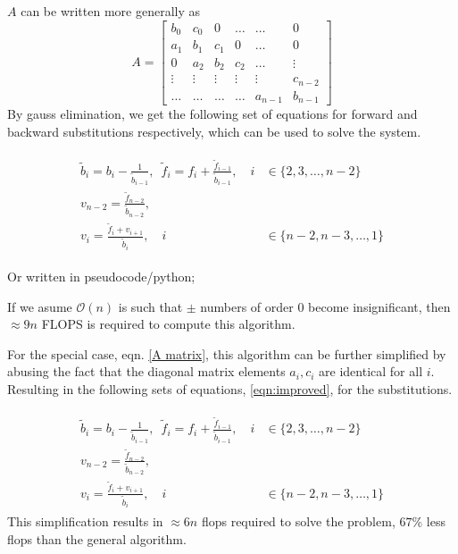 \documentclass[10pt,showpacs,preprintnumbers,footinbib,amsmath,amssymb,aps,prl,twocolumn,groupedaddress,superscriptaddress,showkeys]{revtex4-1}
\begin{document}
  $A$ can be written more generally as
  \begin{equation}
    \label{A matrix general}
    A = \left[ 
    \begin{matrix}
      b_0 & c_0 & 0 & \dots  & \dots &0 \\
      a_1 & b_1 & c_1 & 0 & \dots &  0 \\
      0 & a_2 & b_2 & c_2 & \dots & \vdots  \\
      \vdots & \vdots & \vdots & \vdots & \vdots & c_{n-2}\\
      \dots & \dots & \dots & \dots & a_{n-1} & b_{n-1}
    \end{matrix}
    \right]
  \end{equation}
  By gauss elimination, we get the following set of equations for forward and backward substitutions respectively, which can be used to solve the system.

    \begin{align}
    \begin{split}
      \label{eqn:improved}
      \tilde b_i = b_i - \frac{1}{\tilde b_{i-1}}, 
      \enspace
      \tilde f_i = f_i + \frac{\tilde f_{i -1}}{\tilde b_{i-1}}, 
      \quad i &\in \{2, 3, \dots, n-2\} 
      \\
      v_{n-2} = \frac{\tilde f_{n-2}}{\tilde b_{n-2}}, &
      \\
      v_i = \frac{\tilde f_i + v_{i+1}}{\tilde b_i}, 
      \quad i &\in \{n-2, n-3, \dots, 1\}
    \end{split}
  \end{align}


  Or written in pseudocode/python;
  

  If we asume $\mathcal O(n)$ is such that $\pm$ numbers of order 0 become insignificant, then $\approx 9n$ FLOPS is required to compute this algorithm.

  For the special case, eqn. \ref{A matrix}, this algorithm can be further simplified by abusing the fact that the diagonal matrix elements $a_i, c_i$ are identical for all $i$. Resulting in the following sets of equations, \ref{eqn:improved}, for the substitutions.

  \begin{align}
    \begin{split}
      \label{eqn:improved}
      \tilde b_i = b_i - \frac{1}{\tilde b_{i-1}}, 
      \enspace
      \tilde f_i = f_i + \frac{\tilde f_{i -1}}{\tilde b_{i-1}}, 
      \quad i &\in \{2, 3, \dots, n-2\} 
      \\
      v_{n-2} = \frac{\tilde f_{n-2}}{\tilde b_{n-2}}, &
      \\
      v_i = \frac{\tilde f_i + v_{i+1}}{\tilde b_i}, 
      \quad i &\in \{n-2, n-3, \dots, 1\}
    \end{split}
  \end{align}
  This simplification results in $\approx 6n$ flops required to solve the problem, $67\%$ less flops than the general algorithm.
\end{document}
